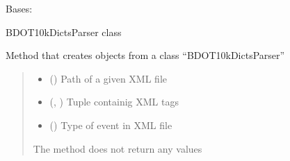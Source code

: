 \documentclass[letterpaper,10pt,english]{sphinxmanual}
\begin{document}

\begin{fulllineitems}
\label{\detokenize{xml_parsers:xml_parsers.BDOT10kDictsParser}}
\pysigstartsignatures
{}
\pysigstopsignatures
\sphinxAtStartPar
Bases: {\hyperref[\detokenize{xml_parsers:xml_parsers.XmlParser}]{}}

\sphinxAtStartPar
BDOT10kDictsParser class

\begin{fulllineitems}
\label{\detokenize{xml_parsers:xml_parsers.BDOT10kDictsParser.__init__}}
\pysigstartsignatures
{}
\pysigstopsignatures
\sphinxAtStartPar
Method that creates objects from a class “BDOT10kDictsParser”
\begin{quote}\begin{description}
\begin{itemize}
\item {} 
\sphinxAtStartPar
{} () \textendash{} Path of a given XML file

\item {} 
\sphinxAtStartPar
{} (\sphinxcode{\sphinxupquote{Tuple}}{[}, \sphinxcode{\sphinxupquote{...}}{]}) \textendash{} Tuple containig XML tags

\item {} 
\sphinxAtStartPar
{} () \textendash{} Type of event in XML file

\end{itemize}

\sphinxAtStartPar
The method does not return any values


\end{description}
\end{quote}
\end{fulllineitems}
\end{fulllineitems}
\end{document}
